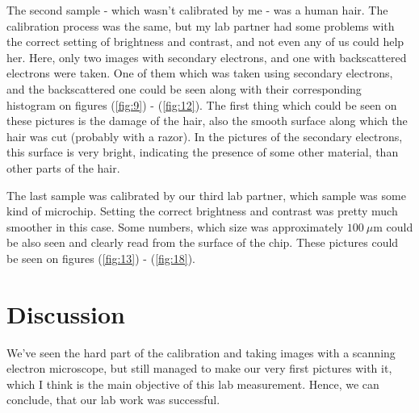 \begin{multicols}{2}
The second sample - which wasn't calibrated by me - was a human hair. The calibration process was the same, but my lab partner had some problems with the correct setting of brightness and contrast, and not even any of us could help her. Here, only two images with secondary electrons, and one with backscattered electrons were taken. One of them which was taken using secondary electrons, and the backscattered one could be seen along with their corresponding histogram on figures (\ref{fig:9}) - (\ref{fig:12}). The first thing which could be seen on these pictures is the damage of the hair, also the smooth surface along which the hair was cut (probably with a razor). In the pictures of the secondary electrons, this surface is very bright, indicating the presence of some other material, than other parts of the hair. \par
The last sample was calibrated by our third lab partner, which sample was some kind of microchip. Setting the correct brightness and contrast was pretty much smoother in this case. Some numbers, which size was approximately $100\ \mu \text{m}$ could be also seen and clearly read from the surface of the chip. These pictures could be seen on figures (\ref{fig:13}) - (\ref{fig:18}).

\section{Discussion}
We've seen the hard part of the calibration and taking images with a scanning electron microscope, but still managed to make our very first pictures with it, which I think is the main objective of this lab measurement. Hence, we can conclude, that our lab work was successful.

\end{multicols}